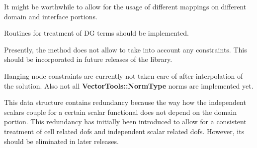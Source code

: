 
\begin{DoxyRefList}
\item[\label{todo__todo000001}%
\hypertarget{todo__todo000001}{}%
Class \hyperlink{class_assembly_helper}{Assembly\+Helper$<$ spacedim $>$} ]It might be worthwhile to allow for the usage of different mappings on different domain and interface portions.

Routines for treatment of DG terms should be implemented. 
\item[\label{todo__todo000005}%
\hypertarget{todo__todo000005}{}%
Member \hyperlink{class_assembly_helper_ac87490e0d3d84b11e2f7187f8706dab6}{Assembly\+Helper$<$ spacedim $>$\+:\+:compare\+\_\+derivatives\+\_\+with\+\_\+numerical\+\_\+derivatives} (const Vector\+Type \&solution, const std\+::vector$<$ const Vector\+Type $\ast$ $>$ solution\+\_\+ref\+\_\+sets, const std\+::string detailed\+\_\+printout\+\_\+file=\char`\"{}\char`\"{}, const double epsilon=1e-\/8) const ]Presently, the method does not allow to take into account any constraints. This should be incorporated in future releases of the library. 
\item[\label{todo__todo000007}%
\hypertarget{todo__todo000007}{}%
Member \hyperlink{class_assembly_helper_ac7860831588d35d05009474f2a695e14}{Assembly\+Helper$<$ spacedim $>$\+:\+:compute\+\_\+distance\+\_\+to\+\_\+other\+\_\+solution} (const Vector\+Type \&solution, const Vector\+Type \&other\+\_\+solution, const Assembly\+Helper$<$ spacedim $>$ \&other\+\_\+assembly\+\_\+helper, const {\bf Quadrature$<$ spacedim $>$} quadrature\+\_\+domain, const {\bf Quadrature}$<$ spacedim-\/1 $>$ quadrature\+\_\+interface, const {\bf Vector\+Tools\+::\+Norm\+Type} norm\+\_\+type=Vector\+Tools\+::\+Norm\+Type\+::\+L2\+\_\+norm, const {\bf Component\+Mask} component\+\_\+mask\+\_\+domain={\bf Component\+Mask()}, const {\bf Component\+Mask} component\+\_\+mask\+\_\+interface={\bf Component\+Mask()}, const double exponent=2.\+0) const ]Hanging node constraints are currently not taken care of after interpolation of the solution. Also not all {\bf Vector\+Tools\+::\+Norm\+Type} norms are implemented yet. 
\item[\label{todo__todo000003}%
\hypertarget{todo__todo000003}{}%
Member \hyperlink{class_assembly_helper_a0edd25820c92a25ae87fc240f4916804}{Assembly\+Helper$<$ spacedim $>$\+:\+:coupled\+\_\+\+C\+\_\+indices\+\_\+scalar\+\_\+functionals\+\_\+domain} ]This data structure contains redundancy because the way how the independent scalars couple for a certain scalar functional does not depend on the domain portion. This redundancy has initially been introduced to allow for a consistent treatment of cell related dofs and independent scalar related dofs. However, its should be eliminated in later releases. 

\end{DoxyRefList}
